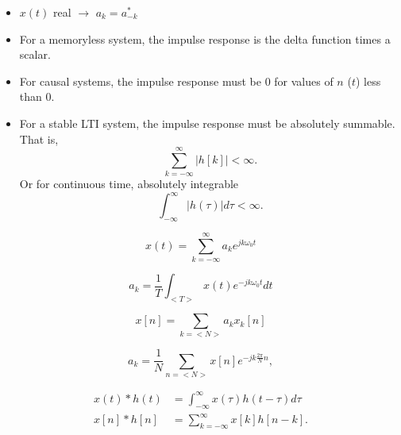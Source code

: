 \documentclass[8pt]{article}
\begin{document}
\begin{itemize}
    \item $x(t)$ real $\rightarrow$ $a_k = a^*_{-k}$
    \item For a memoryless system, the impulse response
          is the delta function times a scalar.
    \item For causal systems, the impulse response must be 0 for values of $n$ ($t$)
          less than 0.
    \item For a stable LTI system, the impulse response must be absolutely summable.
          That is,
          \begin{equation}
              \sum_{k=-\infty}^{\infty} |h[k]| < \infty.
          \end{equation}
          Or for continuous time, absolutely integrable
          \begin{equation}
              \int_{-\infty}^{\infty} |h(\tau)| d\tau < \infty.
          \end{equation}
\end{itemize}

\begin{equation}
    x(t) = \sum_{k=-\infty}^{\infty} a_k e^{jk\omega_0 t}
\end{equation}

\begin{equation}
    a_k = \frac{1}{T} \int_{<T>} x(t) e^{-jk\omega_0 t} dt
\end{equation}

\begin{equation}
    x[n] = \sum_{k=<N>} a_k x_k[n]
\end{equation}

\begin{equation}
    a_k = \frac{1}{N} \sum_{n=<N>} x[n] e^{-jk\frac{2\pi}{N}n},
\end{equation}

\begin{align}
    x(t) * h(t) & = \int_{-\infty}^{\infty} x(\tau) h(t - \tau) d\tau \\
    x[n] * h[n] & = \sum_{k=-\infty}^{\infty} x[k] h[n - k].
\end{align}
\end{document}
